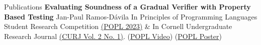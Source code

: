 
\begin{rSection}{Publications}
	\textbf{Evaluating Soundness of a Gradual Verifier with Property Based Testing} \small{Jan-Paul Ramos-D{\'a}vila In \small{Principles of Programming Languages Student Research Competition \href{https://popl23.sigplan.org/details/POPL-2023-student-research-competition/13/Evaluating-Soundness-of-a-Gradual-Verifier-with-Property-Based-Testing}{(POPL 2023\ExternalLink)} \& In Cornell Undergraduate Research Journal \href{https://journals.library.cornell.edu/index.php/CURJ/article/view/696}{(CURJ Vol. 2 No. 1\ExternalLink)}}}. (\href{https://www.youtube.com/watch?v=sIIwmw0z2Yg}{POPL Video\ExternalLink }) (\href{https://jpramos.me/data/pdf/POPL%2023%20SRC%20POSTER.pdf}{POPL Poster\ExternalLink})
\end{rSection}